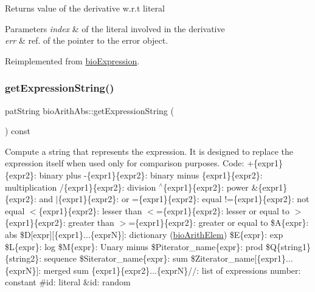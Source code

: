 \begin{DoxyReturn}{Returns}
value of the derivative w.\+r.\+t literal 
\end{DoxyReturn}

\begin{DoxyParams}{Parameters}
{\em index} & of the literal involved in the derivative \\
\hline
{\em err} & ref. of the pointer to the error object. \\
\hline
\end{DoxyParams}


Reimplemented from \hyperlink{classbio_expression_a5915579d1193f25f216c1e273c97f2ce}{bio\+Expression}.

\mbox{\label{classbio_arith_abs_a52f933907c3b7e246228297d1ac253ef}} 
\subsubsection{\texorpdfstring{get\+Expression\+String()}{getExpressionString()}}
{\footnotesize\ttfamily pat\+String bio\+Arith\+Abs\+::get\+Expression\+String (\begin{DoxyParamCaption}{ }\end{DoxyParamCaption}) const\hspace{0.3cm}{\ttfamily [virtual]}}

Compute a string that represents the expression. It is designed to replace the expression itself when used only for comparison purposes. Code\+: +\{expr1\}\{expr2\}\+: binary plus -\/\{expr1\}\{expr2\}\+: binary minus \{expr1\}\{expr2\}\+: multiplication /\{expr1\}\{expr2\}\+: division $^\wedge$\{expr1\}\{expr2\}\+: power \&\{expr1\}\{expr2\}\+: and $\vert$\{expr1\}\{expr2\}\+: or =\{expr1\}\{expr2\}\+: equal !=\{expr1\}\{expr2\}\+: not equal $<$\{expr1\}\{expr2\}\+: lesser than $<$=\{expr1\}\{expr2\}\+: lesser or equal to $>$\{expr1\}\{expr2\}\+: greater than $>$=\{expr1\}\{expr2\}\+: greater or equal to \$A\{expr\}\+: abs \$D\mbox{[}expr\mbox{]}\mbox{[}\{expr1\}...\{exprN\}\mbox{]}\+: dictionary (\hyperlink{classbio_arith_elem}{bio\+Arith\+Elem}) \$E\{expr\}\+: exp \$L\{expr\}\+: log \$M\{expr\}\+: Unary minus \$\+Piterator\+\_\+name\{expr\}\+: prod \$Q\{string1\}\{string2\}\+: sequence \$\+Siterator\+\_\+name\{expr\}\+: sum \$\+Ziterator\+\_\+name\mbox{[}\{expr1\}...\{exprN\}\mbox{]}\+: merged sum \{expr1\}\{expr2\}...\{exprN\}//\+: list of expressions number\+: constant \#id\+: literal \&id\+: random 

